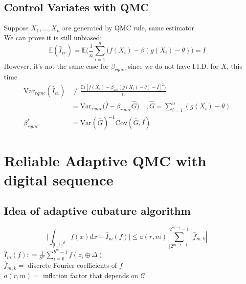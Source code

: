\subsection{Control Variates with QMC}

Suppose $X_1, \dots, X_n$ are generated by QMC rule, same estimator\\
We can prove it is still unbiased:
\[
\mathbb{E}(\hat{I}_{cv})=\mathbb{E}\Big(\frac{1}{n}\sum_{i=1}^{n}\Big( f(X_i)-\beta(g(X_i)-\theta)\Big)=I 
\]
However, it's not the same case for $\beta_{rqmc}$ since we do not have I.I.D. for $X_i$ this time
\begin{align*}
\mathrm{Var}_{rqmc}(\hat{I}_{cv}) &\not= \frac{\mathbb{E}\big([f(X_i)-\beta_{mc}(g(X_i)-\theta)-I]^2 \big)}{n}\\
&=\mathrm{Var}_{rqmc}\Big( \hat{I}- \beta_{rqmc}\hat{G}\Big)\quad , \hat{G}=\sum_{i=1}^{n}(g(X_i)-\theta)\\
\beta_{rqmc}^*&= \mathrm{Var} (\hat{G})^{-1}\mathrm{Cov} (\hat{G}, \hat{I})
\end{align*}


\section{Reliable Adaptive QMC with digital sequence}

\subsection{Idea of adaptive cubature algorithm}
\[
	\Big|\int_{[0,1)^d}f(x)dx - \hat{I}_m(f)\Big| \leq a(r,m) \sum_{\lfloor 2^{m-r-1} \rfloor}^{2^{m-r}-1} |\hat{f}_{m,k}|
\]
$\hat{I}_m(f): = \frac{1}{b^m}\sum_{i=0}^{b^m-1}f(z_i\oplus \Delta)$\\
$\hat{f}_{m,k}=$ discrete Fourier coefficients of $f$\\
$a(r,m) =$ inflation factor that depends on $\mathcal{C}$

